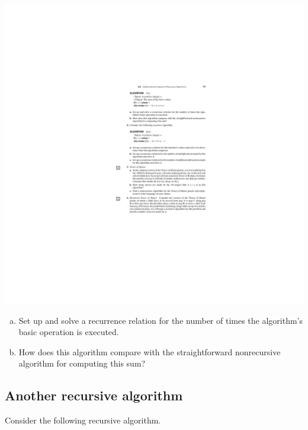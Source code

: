 \documentclass[12pt]{article}
\begin{document}
\includegraphics{w03-alg-S.pdf}

\begin{enumerate}[a.]
    \item Set up and solve a recurrence relation for the number of times the algorithm's basic operation is executed.
    \item How does this algorithm compare with the straightforward nonrecursive algorithm for computing this sum?
\end{enumerate}



\clearpage
\subsection{Another recursive algorithm}

Consider the following recursive algorithm.\\~
\end{document}
